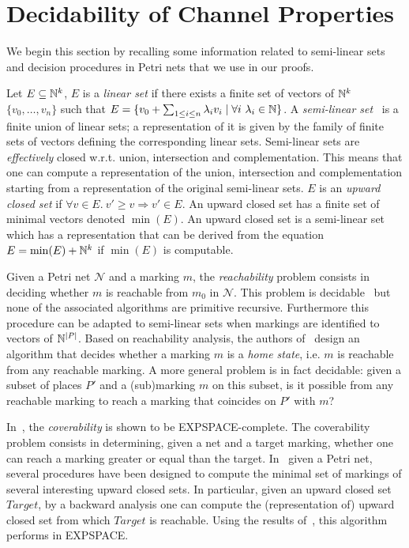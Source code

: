 
\section{Decidability of Channel Properties}
\label{sec:decidability}

We begin this section by recalling some  information related to
semi-linear sets and decision procedures in Petri nets that we use in our proofs.

Let $E \subseteq \mathbb{N}^k$, $E$ is a \emph{linear set}
if there exists a finite set of vectors of $\mathbb{N}^k$ $\{v_0,\ldots,v_n\}$
such that $E=\{v_0 + \sum_{1 \leq i \leq n} \lambda_i v_i\mid \forall i\ \lambda_i \in \mathbb{N}\}$.
A \emph{semi-linear set}~\cite{gs66} is a finite union of linear sets; a representation of it is given
by the family of finite sets of vectors defining the corresponding linear sets.
Semi-linear sets are \emph{effectively} closed w.r.t. union, intersection and complementation.
This means that one can compute a representation of the union, intersection and complementation
starting from a representation of the original semi-linear sets. 
$E$ is an \emph{upward closed set} if $\forall v \in E.\ v'\geq v \Rightarrow v' \in E$.
An upward closed set has a finite set of minimal vectors denoted $\min(E)$. 
An upward closed set is a semi-linear set which has a representation that can be derived
from the equation $E=\min(E)+\mathbb{N}^k$ if $\min(E)$ is computable.

Given a Petri net $\mathcal N$  and a marking $m$, the \emph{reachability}
problem consists in deciding whether $m$ is reachable from $m_0$
in $\mathcal N$. This problem is decidable~\cite{ReachaPbMayer}
but none of the associated algorithms are primitive recursive. 
Furthermore this procedure can be adapted to semi-linear sets
when markings are identified to vectors of $\mathbb{N}^{|P|}$.
Based on reachability analysis, the authors of~\cite{dj89} design an algorithm  
that decides whether a marking $m$ is a \emph{home state}, i.e. $m$ is reachable
from any reachable
marking. A more general problem
is in fact decidable: given a subset of places $P'$ and a (sub)marking $m$ on
this subset, is it possible from any reachable marking to reach
a marking that coincides on $P'$ with $m$?

In~\cite{rackoff78}, the \emph{coverability} is shown 
to be EXPSPACE-complete. The coverability problem
consists in determining, given a net and a target marking, whether one can reach a marking
greater or equal than the target.  
In~\cite{VJ84} given a Petri net, several procedures have been designed to compute the minimal
set of markings of several interesting upward closed sets. In particular,
given an upward closed set $Target$, by a backward analysis one can compute
the (representation of) upward closed set from which $Target$ is reachable.
Using the results of~\cite{rackoff78}, this algorithm performs in EXPSPACE.

